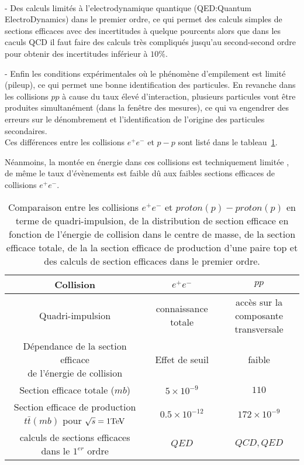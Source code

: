 ~\par- Des calculs limit\'es à l'electrodynamique quantique (QED:Quantum ElectroDynamics) dans le premier ordre, ce qui permet des calculs simples de sections efficaces avec des incertitudes \`a quelque pourcents alors que dans les caculs QCD il faut faire des calculs tr\`es compliqu\'es jusqu'au second-second ordre pour obtenir des incertitudes inf\'erieur \`a $10\%$.
~\par- Enfin les conditions exp\'erimentales où le phénomène d'empilement est limité (pileup), ce qui permet une bonne identification des particules. En revanche dans les collisions $pp$ \`a cause du taux \'elev\'e d'interaction, plusieurs particules vont \^etre produites simultanément (dans la fen\^etre des mesures), ce qui va engendrer des erreurs sur le d\'enombrement et l'identification de l'origine des particules secondaires. \\
Ces diff\'erences entre les collisions $e^{+}e^{-}$ et $p-p$ sont list\'e dans le tableau~\ref{tab:2.1}.
~\par N\'eanmoins, la mont\'ee en \'energie dans ces collisions est techniquement limit\'ee , de m\^eme le taux d'\'ev\`enements est faible d\^u aux faibles sections efficaces de collisions $e^{+}e^{-}$.

\begin{table}[H]
  \centering
  \begin{tabular}[H]{|c|c|c|}
    \hline Collision & $e^{+}e^{-}$ & $pp$ \\
    \hline Quadri-impulsion & connaissance totale & \pbox{20cm}{acc\`es sur la composante\\transversale} \\
    \hline \pbox{20cm}{ Dépendance de la section efficace\\de l'\'energie de collision} & Effet de seuil & faible \\
    \hline Section efficace totale ($mb$) & $5\times10^{-9}$ & $110$ \\
    \hline Section efficace de production ${t\bar{t}}(mb)$ pour $\sqrt{s}=1\rm{TeV}$ & $0.5\times10^{-12}$ & $172\times10^{-9}$ \\
    \hline calculs de sections efficaces dans le $1^{er}$ ordre & $QED$ & $QCD,QED$ \\
    \hline  
  \end{tabular}
  \caption{Comparaison entre les collisions $e^{+}e^{-}$ et $proton(p)-proton(p)$ en terme de quadri-impulsion, de la distribution de section efficace en fonction de l'\'energie de collision dans le centre de masse, de la section efficace totale, de la la section efficace de production d'une paire top et des calculs de section efficaces dans le premier ordre.}
  \label{tab:2.1}
\end{table}

